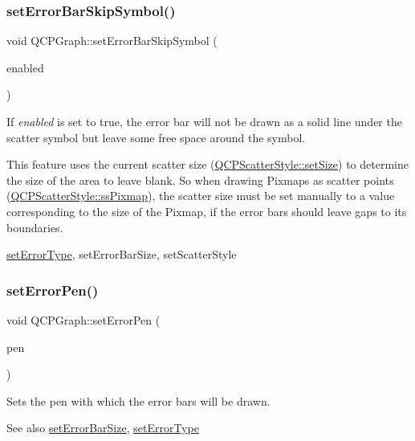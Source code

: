 \subsubsection{\texorpdfstring{set\+Error\+Bar\+Skip\+Symbol()}{setErrorBarSkipSymbol()}}
{\footnotesize\ttfamily void Q\+C\+P\+Graph\+::set\+Error\+Bar\+Skip\+Symbol (\begin{DoxyParamCaption}\item[{bool}]{enabled }\end{DoxyParamCaption})}

If {\itshape enabled} is set to true, the error bar will not be drawn as a solid line under the scatter symbol but leave some free space around the symbol.

This feature uses the current scatter size (\hyperlink{class_q_c_p_scatter_style_aaefdd031052892c4136129db68596e0f}{Q\+C\+P\+Scatter\+Style\+::set\+Size}) to determine the size of the area to leave blank. So when drawing Pixmaps as scatter points (\hyperlink{class_q_c_p_scatter_style_adb31525af6b680e6f1b7472e43859349a8718b849ca7c307b07b8e091efb0c31e}{Q\+C\+P\+Scatter\+Style\+::ss\+Pixmap}), the scatter size must be set manually to a value corresponding to the size of the Pixmap, if the error bars should leave gaps to its boundaries.

\hyperlink{class_q_c_p_graph_ac3614d799c3894f2bc646e99c7f73d38}{set\+Error\+Type}, set\+Error\+Bar\+Size, set\+Scatter\+Style \hypertarget{class_q_c_p_graph_abd4c7f81939e10776ea64603a704f22a}{}\label{class_q_c_p_graph_abd4c7f81939e10776ea64603a704f22a} 
\subsubsection{\texorpdfstring{set\+Error\+Pen()}{setErrorPen()}}
{\footnotesize\ttfamily void Q\+C\+P\+Graph\+::set\+Error\+Pen (\begin{DoxyParamCaption}\item[{const Q\+Pen \&}]{pen }\end{DoxyParamCaption})}

Sets the pen with which the error bars will be drawn. \begin{DoxySeeAlso}{See also}
\hyperlink{class_q_c_p_graph_a10f50c5495ce45ef559ec2066194a335}{set\+Error\+Bar\+Size}, \hyperlink{class_q_c_p_graph_ac3614d799c3894f2bc646e99c7f73d38}{set\+Error\+Type} 
\end{DoxySeeAlso}
\hypertarget{class_q_c_p_graph_ac3614d799c3894f2bc646e99c7f73d38}{}\label{class_q_c_p_graph_ac3614d799c3894f2bc646e99c7f73d38} 
